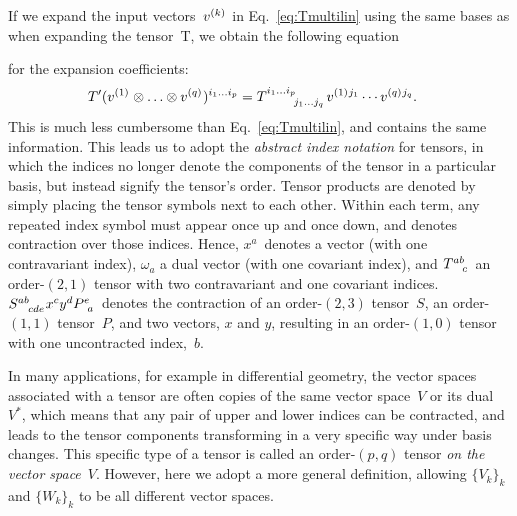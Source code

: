 \documentclass[aps,pra,12pt,nofootinbib,superscriptaddress,longbibliography]{revtex4-1}
\theoremstyle{plain}
\theoremstyle{definition}
\newcommand{\spidx}[3]{^{(#1)}{}\indices{^{#2}_{#3}}}
\newcommand{\bv}{e}     %
\newcommand{\dv}{\eta}  %
\begin{document}
If we expand the input vectors~$v\spidx{k}{}{}$ in
Eq.~\eqref{eq:Tmultilin} using the same bases as when expanding the tensor~T,
we obtain the following equation
\begin{comment}
\begin{align}
\notag
T(v\spidx{1}{}{} \otimes \ldots \otimes v\spidx{q}{}{}) &=
T\indices{^{i_1 \ldots i_p}_{j_1 \ldots j_q}}
v\spidx{1}{k_1}{}
\cdots
v\spidx{q}{k_q}{}
\bv\spidx{1}{}{i_1} \otimes \ldots \otimes \bv\spidx{p}{}{i_p}
\times
\dv\spidx{1}{j_1}{}(\bv\spidx{1}{}{k_1}) \times \ldots \times
\dv\spidx{q}{j_q}{}(\bv\spidx{q}{}{k_q})\\
&=
T\indices{^{i_1 \ldots i_p}_{j_1 \ldots j_q}}
v\spidx{1}{j_1}{}
\cdots
v\spidx{q}{j_q}{}
\bv\spidx{1}{}{i_1} \otimes \ldots \otimes \bv\spidx{p}{}{i_p}
\end{align}
where the last step is due to the dual basis definition,
$\dv^i(e_j) = \delta\indices{^i_j}$,
\end{comment}
for the expansion coefficients:
\begin{align}
T'(v\spidx{1}{}{} \otimes \ldots \otimes v\spidx{q}{}{})\indices{^{i_1 \ldots i_p}}
&=
T\indices{^{i_1 \ldots i_p}_{j_1 \ldots j_q}}
v\spidx{1}{j_1}{}
\cdots
v\spidx{q}{j_q}{}.
\end{align}
This is much less cumbersome than Eq.~\eqref{eq:Tmultilin}, and
contains the same information.
This leads us to adopt the \emph{abstract index notation} for tensors,
in which the indices no longer denote the components of the tensor in a
particular basis, but instead signify the tensor's order.
Tensor products are denoted by simply placing the tensor symbols next to each other.
Within each term, any repeated index symbol must appear once up and once down, and denotes
contraction over those indices.
Hence, $x^a$~denotes a vector (with one contravariant index),
$\omega_a$ a dual vector (with one covariant index),
and $T\indices{^{ab}_c}$ an order-$(2,1)$ tensor with two
contravariant and one covariant indices.
$S\indices{^{ab}_{cde}} x^c y^d P\indices{^e_a}$ denotes the contraction of
an order-$(2,3)$ tensor~$S$,
an order-$(1,1)$ tensor~$P$,
and two vectors, $x$ and $y$, resulting in an order-$(1,0)$ tensor
with one uncontracted index,~$b$.


In many applications, for example in differential geometry, the vector spaces
associated with a tensor are often copies of the same vector space~$V$
or its dual~$V^*$,
which means that any pair of upper and lower indices can be contracted,
and leads to the tensor components transforming
in a very specific way under basis changes.
This specific type of a tensor is called an
order-$(p,q)$ tensor \textit{on the vector space}~$V$.
However, here we adopt a more general definition, allowing $\{V_k\}_k$ and
$\{W_k\}_k$ to be all different vector spaces.
\end{document}
